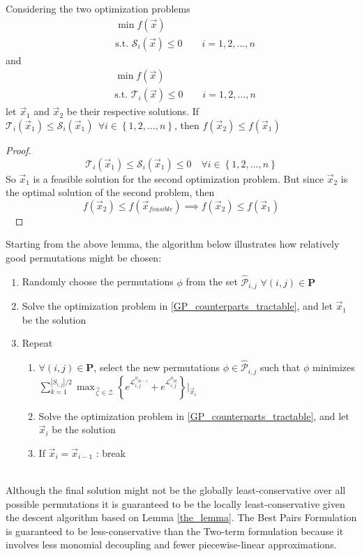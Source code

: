 \begin{lemma}
Considering the two optimization problems 
$$
\begin{aligned}
&\min f(\vec{x})\\
&\text{s.t. } \mathcal{S}_i(\vec{x}) \leq 0 \qquad i = 1,2,...,n
\end{aligned}
$$
and
$$
\begin{aligned}
&\min f(\vec{x})\\
&\text{s.t. } \mathcal{T}_i(\vec{x}) \leq 0 \qquad i = 1,2,...,n
\end{aligned}
$$
let $\vec{x}_1$ and $\vec{x}_2$ be their respective solutions. If $\mathcal{T}_i(\vec{x}_1) \leq \mathcal{S}_i(\vec{x}_1) \ \ \forall i \in \left\{1,2,...,n\right\}$, then $f(\vec{x}_2) \leq f(\vec{x}_1)$
\label{the_lemma}
\end{lemma}
\begin{proof}
$$\mathcal{T}_i(\vec{x}_1) \leq \mathcal{S}_i(\vec{x}_1) \leq 0 \quad \forall i \in \left\{1,2,...,n\right\} $$ 
So $\vec{x}_1$ is a feasible solution for the second optimization problem. But since $\vec{x}_2$ is the optimal solution of the second problem, then
$$f(\vec{x}_2) \leq f(\vec{x}_{feasible}) \implies f(\vec{x}_2) \leq f(\vec{x}_1)$$
\ 
\end{proof}

Starting from the above lemma, the algorithm below illustrates how relatively good permutations might be chosen:
\\
\begin{enumerate}
\item Randomly choose the permutations $\phi$ from the set $\hat{\mathcal{P}}_{i,j}$ $\forall (i,j) \in \mathbf{P}$
\item Solve the optimization problem in \eqref{GP_counterparts_tractable}, and let $\vec{x}_1$ be the solution
\item Repeat
\begin{enumerate}
\item $\forall (i,j) \in \mathbf{P}$, select the new permutations $\phi \in \hat{\mathcal{P}}_{i,j}$ such that $\phi$ minimizes $\textstyle{\sum}_{k=1}^{|S_{i,j}|/2} {\displaystyle \max_{\vec{\zeta} \in \mathcal{Z}}} \left\{e^{\mathcal{L}^{\phi_{2k-1}}_{i,j}} + e^{\mathcal{L}^{\phi_{2k}}_{i,j}}\right\}\bigg\rvert_{\vec{x}_i}$
\item Solve the optimization problem in \eqref{GP_counterparts_tractable}, and let $\vec{x}_i$ be the solution
\item If $\vec{x}_i = \vec{x}_{i-1}$ : break
\end{enumerate}
\end{enumerate}
\ \\
Although the final solution might not be the globally least-conservative over all possible permutations it is guaranteed to be the locally least-conservative given the descent algorithm based on Lemma \eqref{the_lemma}. The Best Pairs Formulation is guaranteed to be less-conservative than the Two-term formulation because it involves less monomial decoupling and fewer piecewise-linear approximations.